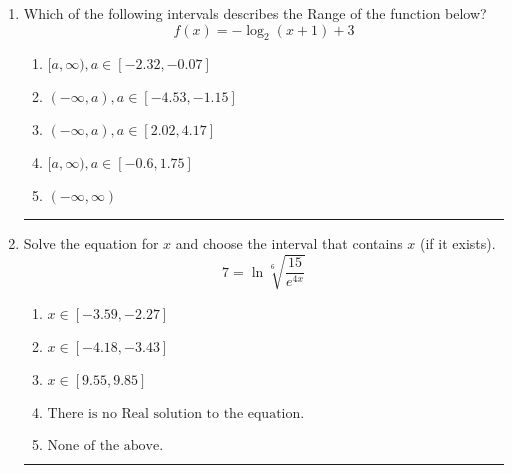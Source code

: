 \documentclass[14pt]{extbook}
\newcommand{\litem}[1]{\item#1\hspace*{-1cm}\rule{\textwidth}{0.4pt}}
\begin{document}
\begin{enumerate}
{\begin{enumerate}[label=\Alph*.]
\end{enumerate} }
\litem{
Which of the following intervals describes the Range of the function below?\[ f(x) = -\log_2{(x+1)}+3 \]\begin{enumerate}[label=\Alph*.]
\item \( [a, \infty), a \in [-2.32, -0.07] \)
\item \( (-\infty, a), a \in [-4.53, -1.15] \)
\item \( (-\infty, a), a \in [2.02, 4.17] \)
\item \( [a, \infty), a \in [-0.6, 1.75] \)
\item \( (-\infty, \infty) \)

\end{enumerate} }
\litem{
 Solve the equation for $x$ and choose the interval that contains $x$ (if it exists).\[  7 = \ln{\sqrt[6]{\frac{15}{e^{4x}}}} \]\begin{enumerate}[label=\Alph*.]
\item \( x \in [-3.59, -2.27] \)
\item \( x \in [-4.18, -3.43] \)
\item \( x \in [9.55, 9.85] \)
\item \( \text{There is no Real solution to the equation.} \)
\item \( \text{None of the above.} \)

\end{enumerate} }
\end{enumerate}
\end{document}

